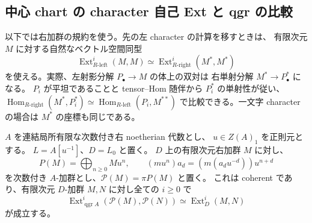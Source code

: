 \subsection{中心 chart の character 自己 Ext と qgr の比較}

以下では右加群の規約を使う。先の左 character の計算を移すときは、
有限次元 $M$ に対する自然なベクトル空間同型
\[
 \operatorname{Ext}_{R\text{-left}}^i(M,M)
 \simeq \operatorname{Ext}_{R\text{-right}}^i(M^*,M^*)
\]
を使える。実際、左射影分解 $P_\bullet\to M$ の体上の双対は
右単射分解 $M^*\to P_\bullet^*$ になる。
$P_i$ が平坦であることと tensor--Hom 随伴から $P_i^*$ の単射性が従い、
$\operatorname{Hom}_{R\text{-right}}(M^*,P_i^*)
\simeq\operatorname{Hom}_{R\text{-left}}(P_i,M^{**})$
で比較できる。一文字 character の場合は $M^*$ の座標も同じである。

\begin{lemma}
\label{cmo:lem:chart-ext}
$A$ を連結局所有限な次数付き右 noetherian 代数とし、
$u\in Z(A)_1$ を正則元とする。
$L=A[u^{-1}]$、$D=L_0$ と置く。
$D$ 上の有限次元右加群 $M$ に対し、
\[
 P(M)=\bigoplus_{n\ge0}M u^n,
 \qquad (m u^n)a_d=(m(a_du^{-d}))u^{n+d}
\]
を次数付き $A$-加群とし、$\mathcal P(M)=\pi P(M)$ と置く。
これは coherent であり、有限次元 $D$-加群 $M,N$ に対し全ての $i\ge0$ で
\[
 \operatorname{Ext}^i_{\operatorname{qgr}A}(\mathcal P(M),\mathcal P(N))
 \simeq\operatorname{Ext}^i_D(M,N)
\]
が成立する。
\end{lemma}
